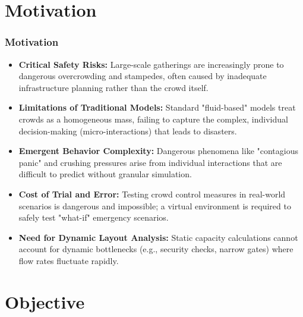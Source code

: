 \documentclass{beamer}
\begin{document}
\section{Motivation}

\begin{frame}
\frametitle{Motivation}
\footnotesize %


\begin{itemize}
    \item \textbf{Critical Safety Risks:} Large-scale gatherings are increasingly prone to dangerous overcrowding and stampedes, often caused by inadequate infrastructure planning rather than the crowd itself.
    \item \textbf{Limitations of Traditional Models:} Standard "fluid-based" models treat crowds as a homogeneous mass, failing to capture the complex, individual decision-making (micro-interactions) that leads to disasters.
    \item \textbf{Emergent Behavior Complexity:} Dangerous phenomena like "contagious panic" and crushing pressures arise from individual interactions that are difficult to predict without granular simulation.
    \item \textbf{Cost of Trial and Error:} Testing crowd control measures in real-world scenarios is dangerous and impossible; a virtual environment is required to safely test "what-if" emergency scenarios.
    \item \textbf{Need for Dynamic Layout Analysis:} Static capacity calculations cannot account for dynamic bottlenecks (e.g., security checks, narrow gates) where flow rates fluctuate rapidly.
\end{itemize}
\end{frame}

\section{Objective}
\end{document}
